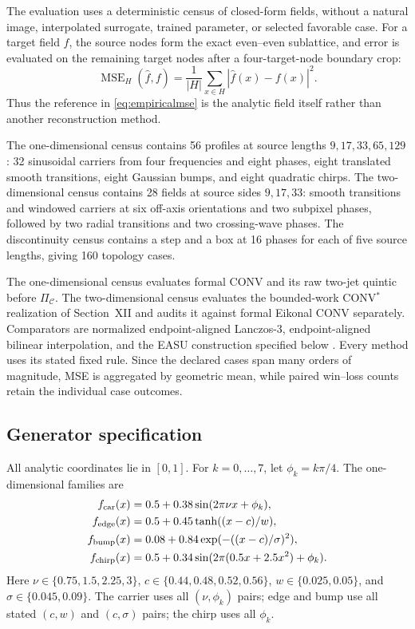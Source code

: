 \documentclass[journal]{IEEEtran}
\begin{document}
The evaluation uses a deterministic census of closed-form fields, without a
natural image, interpolated surrogate, trained parameter, or selected
favorable case. For a target field $f$, the source nodes form the exact
even--even sublattice, and error is evaluated on the remaining target nodes
after a four-target-node boundary crop:
\begin{equation}
 \operatorname{MSE}_{H}(\widehat f,f)
 =\frac{1}{|H|}\sum_{x\in H}|\widehat f(x)-f(x)|^2.
 \label{eq:empiricalmse}
\end{equation}
Thus the reference in \eqref{eq:empiricalmse} is the analytic field itself
rather than another reconstruction method.

The one-dimensional census contains 56 profiles at source lengths
$9,17,33,65,129$: 32 sinusoidal carriers from four frequencies and eight
phases, eight translated smooth transitions, eight Gaussian bumps, and eight
quadratic chirps. The two-dimensional census contains 28 fields at source
sides $9,17,33$: smooth transitions and windowed carriers at six off-axis
orientations and two subpixel phases, followed by two radial transitions and
two crossing-wave phases. The discontinuity census contains a step and a box
at 16 phases for each of five source lengths, giving 160 topology cases.

The one-dimensional census evaluates formal CONV and its raw two-jet
quintic before \(\Pi_{\mathcal C}\). The two-dimensional census evaluates
the bounded-work CONV$^{*}$ realization of Section~XII and audits it against
formal Eikonal CONV separately. Comparators are normalized endpoint-aligned
Lanczos-3, endpoint-aligned bilinear interpolation, and the EASU construction
specified below \cite{lanczos1956,lottes2021}. Every method uses its stated
fixed rule. Since the declared cases span many orders of magnitude, MSE is
aggregated by geometric mean, while paired win--loss counts retain the
individual case outcomes.

\subsection{Generator specification}

All analytic coordinates lie in \([0,1]\). For \(k=0,\ldots,7\), let
\(\phi_k=k\pi/4\). The one-dimensional families are
\begin{align}
 f_{\rm car}(x)&=0.5+0.38\sin(2\pi\nu x+\phi_k),\nonumber\\
 f_{\rm edge}(x)&=0.5+0.45\tanh((x-c)/w),\nonumber\\
 f_{\rm bump}(x)&=0.08+0.84\exp(-((x-c)/\sigma)^2),\nonumber\\
 f_{\rm chirp}(x)&=0.5+0.34\sin(2\pi(0.5x+2.5x^2)+\phi_k).
 \label{eq:onedgenerators}
\end{align}
Here \(\nu\in\{0.75,1.5,2.25,3\}\),
\(c\in\{0.44,0.48,0.52,0.56\}\),
\(w\in\{0.025,0.05\}\), and
\(\sigma\in\{0.045,0.09\}\). The carrier uses all \((\nu,\phi_k)\)
pairs; edge and bump use all stated \((c,w)\) and \((c,\sigma)\) pairs;
the chirp uses all \(\phi_k\).
\end{document}
